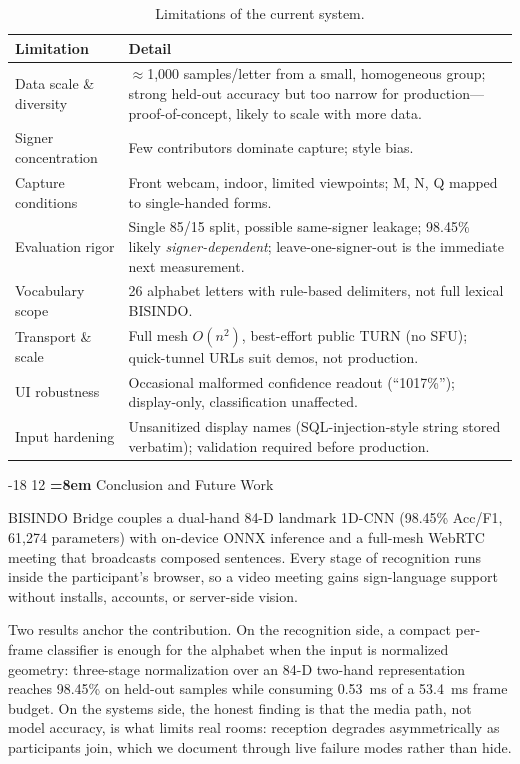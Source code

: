 \documentclass{llncs}
\makeatletter
\renewcommand\section{\@startsection{section}{1}{\z@}%
                      {-18\p@ \@plus -4\p@ \@minus -4\p@}%
                      {12\p@ \@plus 4\p@ \@minus 4\p@}%
                      {\normalfont\Large\bfseries\boldmath
                       \rightskip=\z@ \@plus 8em\pretolerance=10000 }}
\makeatother
\begin{document}
\begin{table}[t]
\caption{Limitations of the current system.}
\label{tab:limitations}
\centering
\setlength{\tabcolsep}{4pt}
\begin{tabular}{@{}p{30mm}p{82mm}@{}}
\toprule
Limitation & Detail \\
\midrule
Data scale \& diversity & $\approx$1{,}000 samples/letter from a small, homogeneous group; strong held-out accuracy but too narrow for production---proof-of-concept, likely to scale with more data. \\
Signer concentration & Few contributors dominate capture; style bias. \\
Capture conditions & Front webcam, indoor, limited viewpoints; M, N, Q mapped to single-handed forms. \\
Evaluation rigor & Single 85/15 split, possible same-signer leakage; 98.45\% likely \emph{signer-dependent}; leave-one-signer-out is the immediate next measurement. \\
Vocabulary scope & 26 alphabet letters with rule-based delimiters, not full lexical BISINDO. \\
Transport \& scale & Full mesh $O(n^2)$, best-effort public TURN (no SFU); quick-tunnel URLs suit demos, not production. \\
UI robustness & Occasional malformed confidence readout (``1017\%''); display-only, classification unaffected. \\
Input hardening & Unsanitized display names (SQL-injection-style string stored verbatim); validation required before production. \\
\bottomrule
\end{tabular}
\end{table}

\section{Conclusion and Future Work}
\label{sec:conclusion}

BISINDO Bridge couples a dual-hand 84-D landmark 1D-CNN (98.45\% Acc/F1,
61{,}274 parameters) with on-device ONNX inference and a full-mesh WebRTC
meeting that broadcasts composed sentences. Every stage of recognition
runs inside the participant's browser, so a video meeting gains
sign-language support without installs, accounts, or server-side vision.

Two results anchor the contribution. On the recognition side, a compact
per-frame classifier is enough for the alphabet when the input is
normalized geometry: three-stage normalization over an 84-D two-hand
representation reaches 98.45\% on held-out samples while consuming
0.53~ms of a 53.4~ms frame budget. On the systems side, the honest
finding is that the media path, not model accuracy, is what limits real
rooms: reception degrades asymmetrically as participants join, which we
document through live failure modes rather than hide.
\end{document}
